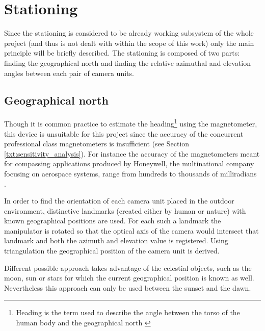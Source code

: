 \section{Stationing}

Since the stationing is considered to be already working subsystem of the whole project (and thus is not dealt with within the scope of this work) only the main principle will be briefly described. The stationing is composed of two parts: finding the geographical north and finding the relative azimuthal and elevation angles between each pair of camera units.

\subsection{Geographical north} \label{txt:geographical_north}

Though it is common practice to estimate the heading\footnote{Heading is the term used to describe the angle between the torso of the human body and the geographical north \cite{Henriksson648760}} using the magnetometer, this device is unsuitable for this project since the accuracy of the concurrent professional class magnetometers is insufficient (see Section \ref{txt:sensitivity_analysis}). For instance the accuracy of the magnetometers meant for compassing applications produced by Honeywell, the multinational company focusing on aerospace systems, range from hundreds to thousands of milliradians \cite{Honeywell:compassing_catalog}.

In order to find the orientation of each camera unit placed in the outdoor environment, distinctive landmarks (created either by human or nature) with known geographical positions are used. For each such a landmark the manipulator is rotated so that the optical axis of the camera would intersect that landmark and both the azimuth and elevation value is registered. Using triangulation the geographical position of the camera unit is derived. 

Different possible approach takes advantage of the celestial objects, such as the moon, sun or stars for which the current geographical position is known as well. Nevertheless this approach can only be used between the sunset and the dawn.

